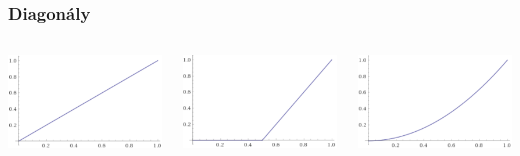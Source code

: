 \documentclass{beamer}
\begin{document}
\begin{frame}
\frametitle{Diagonály}
\begin{columns}
\begin{minipage}[c][0.4\textheight][c]{\linewidth}
  \centering
  \includegraphics[width=0.8\linewidth]{minDiag}
\end{minipage}
\begin{minipage}[c][0.4\textheight][c]{\linewidth}
  \centering
  \includegraphics[width=0.8\linewidth]{lukaDiag}
\end{minipage}
\begin{minipage}[c][0.4\textheight][c]{\linewidth}
  \centering
  \includegraphics[width=0.8\linewidth]{prodDiag}

\end{minipage}
\end{columns}
\end{frame}
\end{document}

